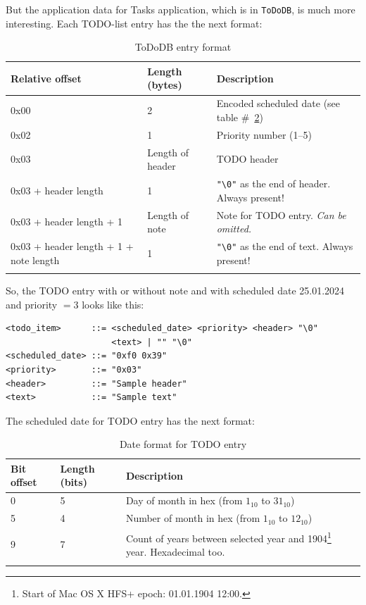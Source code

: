 \documentclass[a4paper,12pt,oneside]{scrartcl}
\begin{document}
But the application data for Tasks application, which is in \texttt{ToDoDB}, is
much more interesting. Each TODO-list entry has the the next format:
\begin{longtable}[H]{|p{5cm}|p{3.5cm}|p{5cm}|}
  \hline
  \textbf{Relative offset} & \textbf{Length (bytes)} & \textbf{Description} \\
  \hline
  0x00 & 2 & Encoded scheduled date (see table \#~\ref{tab:todo-date-format}) \\
  \hline
  0x02 & 1 & Priority number (1--5) \\
  \hline
  0x03 & Length of header & TODO header \\
  \hline
  0x03 + header length & 1 & \texttt{"\textbackslash{}0"} as the end of header. Always present! \\
  \hline
  0x03 + header length + 1 & Length of note & Note for TODO entry. \textit{Can be omitted.} \\
  \hline
  0x03 + header length + 1 + note length & 1 & \texttt{"\textbackslash{}0"} as the end of text. Always present! \\
  \hline
  \caption{ToDoDB entry format}
  \label{tab:todo-entry-format}
\end{longtable}

So, the TODO entry with or without note and with scheduled date 25.01.2024 and
priority $= 3$ looks like this:
\begin{verbatim}
<todo_item>      ::= <scheduled_date> <priority> <header> "\0"
                     <text> | "" "\0"
<scheduled_date> ::= "0xf0 0x39"
<priority>       ::= "0x03"
<header>         ::= "Sample header"
<text>           ::= "Sample text"
\end{verbatim}

The scheduled date for TODO entry has the next format:
\begin{longtable}[H]{|p{3cm}|p{3.5cm}|p{7cm}|}
  \hline
  \textbf{Bit offset} & \textbf{Length (bits)} & \textbf{Description} \\
  \hline
  0 & 5 & Day of month in hex (from $1_{10}$ to $31_{10}$) \\
  \hline
  5 & 4 & Number of month in hex (from $1_{10}$ to $12_{10}$) \\
  \hline
  9 & 7 & Count of years between selected year and 1904\footnote{Start of Mac
          OS X HFS+ epoch: 01.01.1904 12:00.} year. Hexadecimal too. \\
  \hline
  \caption{Date format for TODO entry}
  \label{tab:todo-date-format}
\end{longtable}
\end{document}
